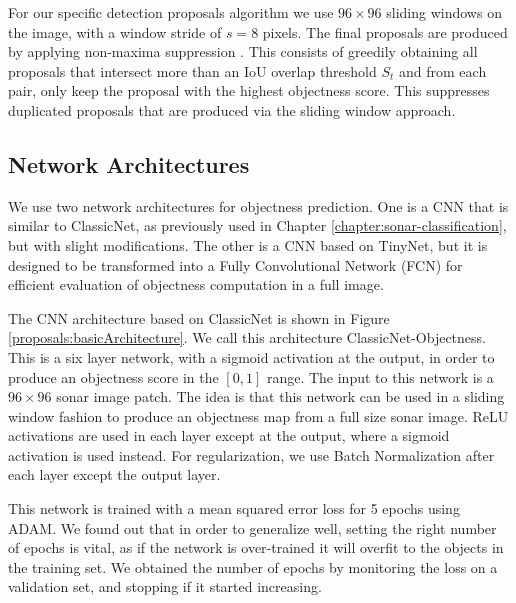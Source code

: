 For our specific detection proposals algorithm we use $96 \times 96$ sliding windows on the image, with a window stride of $s = 8$ pixels. The final proposals are produced by applying non-maxima suppression \cite{gonzalezDIP2006}. This consists of greedily obtaining all proposals that intersect more than an IoU overlap threshold $S_t$ and from each pair, only keep the proposal with the highest objectness score. This suppresses duplicated proposals that are produced via the sliding window approach.

\subsection{Network Architectures}

We use two network architectures for objectness prediction. One is a CNN that is similar to ClassicNet, as previously used in Chapter \ref{chapter:sonar-classification}, but with slight modifications. The other is a CNN based on TinyNet, but it is designed to be transformed into a Fully Convolutional Network (FCN) \cite{long2015fully} for efficient evaluation of objectness computation in a full image.

The CNN architecture based on ClassicNet is shown in Figure \ref{proposals:basicArchitecture}. We call this architecture ClassicNet-Objectness. This is a six layer network, with a sigmoid activation at the output, in order to produce an objectness score in the $[0, 1]$ range. The input to this network is a $96 \times 96$ sonar image patch. The idea is that this network can be used in a sliding window fashion to produce an objectness map from a full size sonar image. ReLU activations are used in each layer except at the output, where a sigmoid activation is used instead. For regularization, we use Batch Normalization after each layer except the output layer.

This network is trained with a mean squared error loss for 5 epochs using ADAM. We found out that in order to generalize well, setting the right number of epochs is vital, as if the network is over-trained it will overfit to the objects in the training set. We obtained the number of epochs by monitoring the loss on a validation set, and stopping if it started increasing.

